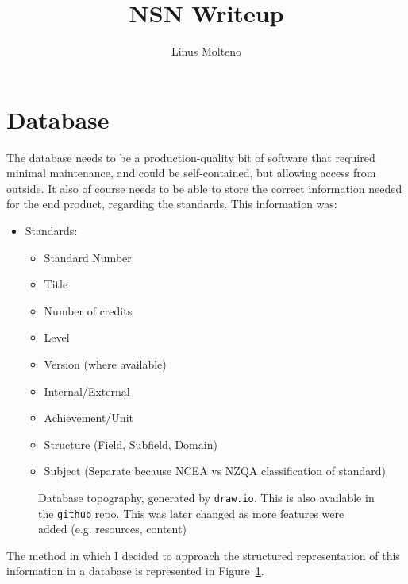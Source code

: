 \documentclass{article}
\title{NSN Writeup}
\author{Linus Molteno}
\date{}
\begin{document}
\maketitle

\section{Database}

The database needs to be a production-quality bit of software that required minimal maintenance, and could be self-contained, but allowing access from outside. It also of course needs to be able to store the correct information needed for the end product, regarding the standards. This information was:
\begin{itemize}
    \item Standards:
        \begin{itemize}
            \item Standard Number
            \item Title
            \item Number of credits
            \item Level
            \item Version (where available)
            \item Internal/External
            \item Achievement/Unit
            \item Structure (Field, Subfield, Domain)
            \item Subject (Separate because NCEA vs NZQA classification of standard)
        \end{itemize}
\end{itemize}

\begin{figure}
    \caption{Database topography, generated by \texttt{draw.io}. This is also available in the \texttt{github} repo. This was later changed as more features were added (e.g. resources, content)}
    \label{fig:dbtopography}
\end{figure}
The method in which I decided to approach the structured representation of this information in a database is represented in Figure~\ref{fig:dbtopography}.
\end{document}
